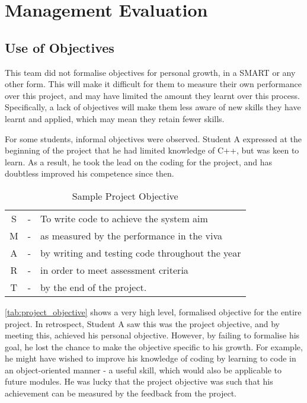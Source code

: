 


\section{Management Evaluation}\label{sec:management}
    \subsection{Use of Objectives}\label{subsec:management-objectives}
        This team did not formalise objectives for personal growth, in a SMART or any other form.
        This will make it difficult for them to measure their own performance over this project, and may have limited the amount they learnt over this process.
        Specifically, a lack of objectives will make them less aware of new skills they have learnt and applied, which may mean they retain fewer skills.

        For some students, informal objectives were observed.
        Student A expressed at the beginning of the project that he had limited knowledge of C++, but was keen to learn.
        As a result, he took the lead on the coding for the project, and has doubtless improved his competence since then.

        \begin{table}[h]
            \centering
            \caption{Sample Project Objective}
            \label{tab:project_objective}
            \begin{tabular}{ccl}
                S & - & To write code to achieve the system aim         \\
                M & - & as measured by the performance in the viva      \\
                A & - & by writing and testing code throughout the year \\
                R & - & in order to meet assessment criteria            \\
                T & - & by the end of the project.
            \end{tabular}
        \end{table} %

        \autoref{tab:project_objective} shows a very high level, formalised objective for the entire project.
        In retrospect, Student A saw this was the project objective, and by meeting this, achieved his personal objective.
        However, by failing to formalise his goal, he lost the chance to make the objective specific to his growth.
        For example, he might have wished to improve his knowledge of coding by learning to code in an object-oriented manner - a useful skill, which would also be applicable to future modules.
        He was lucky that the project objective was such that his achievement can be measured by the feedback from the project.

